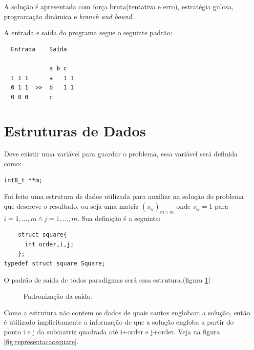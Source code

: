 \documentclass[10.9pt]{article}
\begin{document}
A solução é apresentada com força bruta(tentativa e erro), estratégia gulosa, programação dinâmica e \emph{branch and bound}.

A entrada e saída do programa segue o seguinte padrão:
\begin{verbatim}
  Entrada    Saída

             a b c
  1 1 1      a   1 1
  0 1 1  >>  b   1 1 
  0 0 0      c        
\end{verbatim}
\section{Estruturas de Dados}
\label{sec:org3c63b7e}
Deve existir uma variável para guardar o problema, essa variável será definida como:
\begin{verbatim}
int8_t **m;
\end{verbatim}
Foi feito uma estrutura de dados utilizada para auxiliar na solução do problema que descreve o resultado, ou seja uma matriz \((s_{ij})_{m\times m}\) onde \(s_{ij} = 1\) para \(i=1,...,m \land j=1,...,m\).
Sua definição é a seguinte:
\begin{verbatim}
    struct square{
      int order,i,j;
    };
typedef struct square Square;
\end{verbatim}

O padrão de saída de todos paradigmas será essa estrutura.(figura \ref{fig:resultstandard})

\begin{figure}
\centering
{}
\caption{Padronização da saída.}\label{fig:resultstandard}
\end{figure}

Como a estrutura não contem os dados de quais cantos englobam a solução, então é utilizado implicitamente a informação de que a solução engloba a partir do ponto i e j da submatriz quadrada até i+order e j+order. Veja na figura \ref{fig:representacaosquare}.
\end{document}
